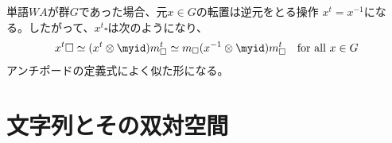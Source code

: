 	\begin{note}[アンチポードとの類似]\label{note:アンチポードとの類似} %
		単語$WA$が群$G$であった場合、元$x\in G$の転置は逆元をとる操作
		$x^t=x^{-1}$になる。したがって、$x^t\square$は次のようになり、
		\begin{equation*}\begin{split} %
			x^t\square \simeq (x^t\otimes\myid)m_\square^t 
			\simeq m_\square(x^{-1}\otimes\myid)m_\square^t 
			\quad\text{for all }x\in G \\
		\end{split}\end{equation*} %
		アンチポードの定義式によく似た形になる。
	\end{note} %

\section{文字列とその双対空間}\label{s1:文字列とその双対空間} %

